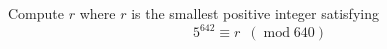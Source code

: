 Compute $r$ where $r$ is the smallest positive integer satisfying
\[
 5^{642} \equiv r \,\,\,(\operatorname{mod} 640)
\]
